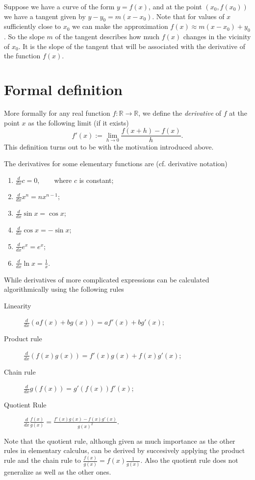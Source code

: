 \documentclass[12pt]{article}
\def\R{{\mathbb R}}
\begin{document}
	Suppose we have a curve of the form $y=f(x)$, and at the point
	$(x_0,f(x_0))$ we have a tangent given by $y-y_0=m(x-x_0)$. Note that
	for values of $x$ sufficiently close to $x_0$ we can make the
	approximation $f(x)\approx m(x-x_0)+y_0$. So the slope $m$ of the
	tangent describes how much $f(x)$ changes in the vicinity of $x_0$. It
	is the slope of the tangent that will be associated with the
	derivative of the function $f(x)$.

\section*{Formal definition}
	More formally for any real function $f\colon\R\to\R$, we define the
	{\em derivative} of $f$ at the point $x$ as the following limit (if
	it exists)
	\[
		f'(x) := \lim_{h\to 0} \frac{f(x+h)-f(x)}{h}.
	\]
	This definition turns out to be  with
	the motivation introduced above.

	The derivatives for some elementary functions are (cf. derivative
	notation)
	\begin{enumerate}
	\item $\displaystyle \frac{d}{dx} c = 0$, ~~~ where $c$ is constant;
	\item $\displaystyle \frac{d}{dx} x^n = nx^{n-1}$;
	\item $\displaystyle \frac{d}{dx} \sin x = \cos x$;
	\item $\displaystyle \frac{d}{dx} \cos x = -\sin x$;
	\item $\displaystyle \frac{d}{dx} e^x = e^x$;
	\item $\displaystyle \frac{d}{dx} \ln x = \frac{1}{x}$.
	\end{enumerate}
	While derivatives of more complicated expressions can be
	calculated algorithmically using the following rules
	\begin{description}
	\item[Linearity] $\displaystyle \frac{d}{dx}\left(af(x)+bg(x)\right) = af'(x)+bg'(x)$;
	\item[Product rule] $\displaystyle \frac{d}{dx}\left(f(x)g(x)\right)
		= f'(x)g(x) + f(x)g'(x)$;
	\item[Chain rule] $\displaystyle \frac{d}{dx}g(f(x)) = g'(f(x))f'(x)$;
	\item[Quotient Rule] $\displaystyle \frac{d}{dx}\frac{f(x)}{g(x)} = 
		\frac{f'(x)g(x)-f(x)g'(x)}{g(x)^2}$.
	\end{description}
	Note that the quotient rule, although given as much importance as the
	other rules in elementary calculus, can be derived by succesively
	applying the product rule and the chain rule to
	$\displaystyle \frac{f(x)}{g(x)}=f(x)\frac{1}{g(x)}$. Also the quotient rule does not generalize as well as the other ones.
\end{document}
